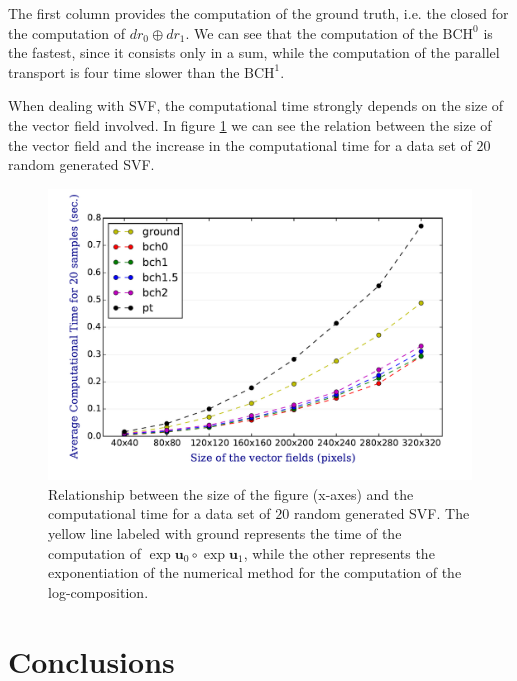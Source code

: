 The first column provides the computation of the ground truth, i.e. the closed for the computation of $dr_0 \oplus dr_{1}$. We can see that the computation of the $\text{BCH}^0$ is the fastest, since it consists only in a sum, while the computation of the parallel transport is four time slower than the $\text{BCH}^1$.

When dealing with SVF, the computational time strongly depends on the size of the vector field involved. In figure \ref{fig:svf_computational_time} we can see the relation between the size of the vector field and the increase in the computational time for a data set of $20$ random generated SVF.

\begin{figure}[!ht]
	\includegraphics[scale=0.7]{figures/svf_computational_time.pdf}
	\caption{Relationship between the size of the figure (x-axes) and the computational time for a data set of $20$ random generated SVF. The yellow line labeled with ground represents the time of the computation of $\exp{\mathbf{u}_0}\circ \exp{\mathbf{u}_1}$, while the other represents the exponentiation of the numerical method for the computation of the log-composition.}
	\label{fig:svf_computational_time}
\end{figure}

\section{Conclusions}\label{se:conclusions}

